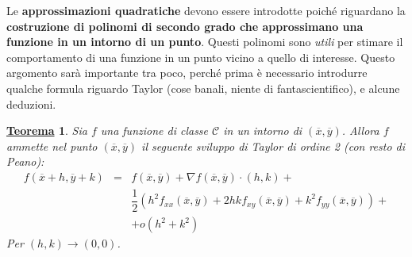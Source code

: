 \documentclass[a4paper]{article}
\newtheorem{theorem}{\textcolor{Red3}{\underline{Teorema}}}
\newcommand{\definition}[1]{\textcolor{Red3}{\textbf{#1}}}
\begin{document}
	Le \definition{approssimazioni quadratiche} devono essere introdotte poiché riguardano la \textbf{costruzione di polinomi di secondo grado che approssimano una funzione in un intorno di un punto}. Questi polinomi sono \emph{utili} per stimare il comportamento di una funzione in un punto vicino a quello di interesse. Questo argomento sarà importante tra poco, perché prima è necessario introdurre qualche formula riguardo Taylor (cose banali, niente di fantascientifico), e alcune deduzioni.

	\begin{theorem}
		Sia $f$ una funzione di classe $\mathcal{C}$ in un intorno di $\left(\overline{x}, \overline{y}\right)$. Allora $f$ ammette nel punto $\left(\overline{x}, \overline{y}\right)$ il seguente sviluppo di Taylor di ordine 2 (con resto di Peano):
		\begin{equation}\label{eq: sviluppo di Taylor di ordine 2 (con resto di Peano)}
			\begin{array}{rcl}
				f\left(\overline{x}+h, \overline{y}+k\right) 
				& = &
				f\left(\overline{x},\overline{y}\right) +
				\nabla f\left(\overline{x}, \overline{y}\right) \cdot \left(h,k\right) + \\ [.5em]
				&&
				\dfrac{1}{2} 
				\left(
					h^{2} f_{xx}\left(\overline{x},\overline{y}\right) +
					2 h k f_{xy}\left(\overline{x},\overline{y}\right) +
					k^{2} f_{yy}\left(\overline{x},\overline{y}\right)
				\right) + \\ [1em]
				&& + o\left(h^{2} + k^{2}\right)
			\end{array}
		\end{equation}
		Per $\left(h,k\right) \rightarrow \left(0,0\right)$.
	\end{theorem}\newpage
\end{document}
